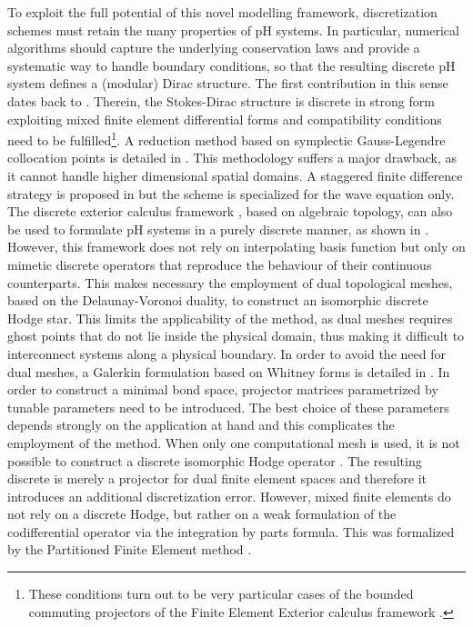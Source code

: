 \documentclass{elsarticle}
\begin{document}
To exploit the full potential of this novel modelling framework, discretization schemes must retain the many properties of pH systems. In particular, numerical algorithms should capture the underlying conservation laws and provide a systematic way to handle boundary conditions, so that the resulting discrete pH system defines a (modular) Dirac structure. The first contribution in this sense dates back to \cite{golo2004hamiltonian}. Therein, the Stokes-Dirac structure is discrete in strong form exploiting mixed finite element differential forms and compatibility conditions need to be fulfilled\footnote{These conditions turn out to be very particular cases of the bounded commuting projectors of the Finite Element Exterior calculus framework \cite{arnold2006acta}.}.
A reduction method based on symplectic Gauss-Legendre collocation points is detailed in \cite{moulla2012pseudo}. This methodology suffers a major drawback, as it cannot handle higher dimensional spatial domains. A staggered finite difference strategy is proposed in \cite{trenchant2018} but the scheme is specialized for the wave equation only. The discrete exterior calculus framework \cite{hirani2003discrete}, based on algebraic topology, can also be used to formulate pH systems in a purely discrete manner, as shown in \cite{seslija2014simplicial}. However, this framework does not rely on interpolating basis function but only on  mimetic discrete operators that reproduce the behaviour of their continuous counterparts. This makes necessary the employment of dual topological meshes, based on the Delaunay-Voronoi duality, to construct an isomorphic discrete Hodge star. This limits the applicability of the method, as dual meshes requires ghost points that do not lie inside the physical domain, thus making it difficult to interconnect systems along a physical boundary. In order to avoid the need for dual meshes, a Galerkin formulation based on Whitney forms is detailed in \cite{kotyczka2019discrete}. In order to construct a minimal bond space, projector matrices parametrized by tunable parameters need to be introduced. The best choice of these parameters depends strongly on the application at hand and this complicates the employment of the method. When only one computational mesh is used, it is not possible to construct a discrete isomorphic Hodge operator \cite{hiptmair2001,bochev2006}. The resulting discrete is merely a projector for dual finite element spaces and therefore it introduces an additional discretization error. However, mixed finite elements do not rely on a discrete Hodge, but rather on a weak formulation of the codifferential operator via the integration by parts formula. This was formalized by the Partitioned Finite Element method \cite{cardoso2020pfem}. \\
\end{document}
